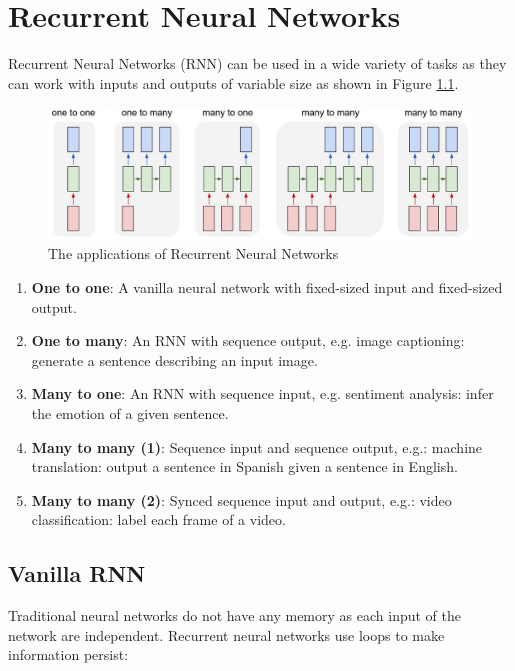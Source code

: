 \chapter{Recurrent Neural Networks}

Recurrent Neural Networks (RNN) can be used in a wide variety of tasks as they can work with inputs and outputs of variable size as shown in Figure \ref{rnn-applications}.
\begin{figure}[H]
    \centering
    \includegraphics[width=\textwidth]{Images/rnn.jpeg}
    \caption{The applications of Recurrent Neural Networks \cite{unres-rnn}}
    \label{rnn-applications}
\end{figure}

\begin{enumerate}
     \itemsep0em
     \item \textbf{One to one}: A vanilla neural network with fixed-sized input and fixed-sized output.
     \item \textbf{One to many}: An RNN with sequence output, e.g. image captioning: generate a sentence describing an input image.
     \item \textbf{Many to one}: An RNN with sequence input, e.g. sentiment analysis: infer the emotion of a given sentence.
     \item \textbf{Many to many (1)}: Sequence input and sequence output, e.g.: machine translation: output a sentence in Spanish given a sentence in English.
     \item \textbf{Many to many (2)}: Synced sequence input and output, e.g.: video classification: label each frame of a video.
\end{enumerate}

\section{Vanilla RNN}
Traditional neural networks do not have any memory as each input of the network are independent. Recurrent neural networks use loops to make information persist:

